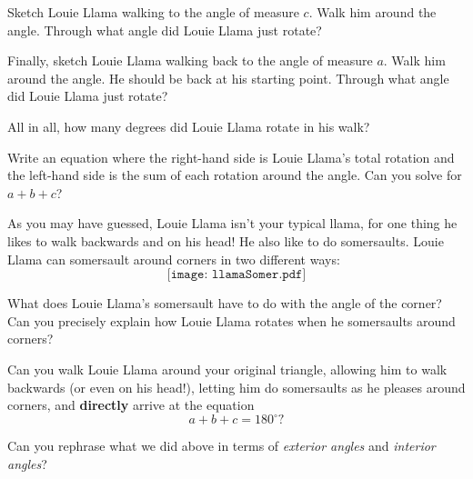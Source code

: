 \documentclass[handout,nooutcomes,noauthor]{ximera}
\begin{document}
\begin{problem}
Sketch Louie Llama walking to the angle of measure $c$. Walk him
around the angle. Through what angle did Louie Llama just rotate?
\end{problem}

\begin{problem}
Finally, sketch Louie Llama walking back to the angle of measure
$a$. Walk him around the angle. He should be back at his starting
point. Through what angle did Louie Llama just rotate?
\end{problem}

\begin{problem} 
All in all, how many degrees did Louie Llama rotate in his walk?
\end{problem}

\begin{problem} 
Write an equation where the right-hand side is Louie Llama's total
rotation and the left-hand side is the sum of each rotation around the
angle. Can you solve for $a+b+c$?
\end{problem}

As you may have guessed, Louie Llama isn't your typical llama, for one
thing he likes to walk backwards and on his head! He also like to do
somersaults. Louie Llama can somersault around corners in two
different ways:
\[
\texttt{[image: llamaSomer.pdf]}
\]

\begin{problem} 
What does Louie Llama's somersault have to do with the angle of the
corner? Can you precisely explain how Louie Llama rotates when he
somersaults around corners?
\end{problem}


\begin{problem}
Can you walk Louie Llama around your original triangle, allowing him to
walk backwards (or even on his head!), letting him do somersaults as
he pleases around corners, and \textbf{directly} arrive at the
equation
\[
a + b + c = 180^\circ?
\]
\end{problem}

\begin{problem} 
Can you rephrase what we did above in terms of \textit{exterior angles} and \textit{interior angles}?
\end{problem}

\break
\end{document}
